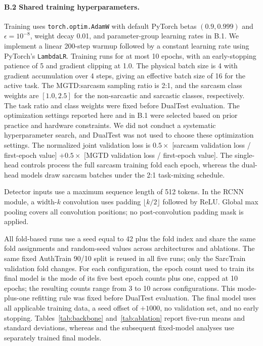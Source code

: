 \paragraph{B.2 Shared training hyperparameters.} Training uses \texttt{torch.optim.AdamW} with default PyTorch betas $(0.9,0.999)$ and $\epsilon=10^{-8}$, weight decay 0.01, and parameter-group learning rates in B.1. We implement a linear 200-step warmup followed by a constant learning rate using PyTorch's \texttt{LambdaLR}. Training runs for at most 10 epochs, with an early-stopping patience of 5 and gradient clipping at 1.0. The physical batch size is 4 with gradient accumulation over 4 steps, giving an effective batch size of 16 for the active task. The MGTD:sarcasm sampling ratio is 2:1, and the sarcasm class weights are $[1.0, 2.5]$ for the non-sarcastic and sarcastic classes, respectively. The task ratio and class weights were fixed before DualTest evaluation. The optimization settings reported here and in B.1 were selected based on prior practice and hardware constraints. We did not conduct a systematic hyperparameter search, and DualTest was not used to choose these optimization settings. The normalized joint validation loss is $0.5 \times$ [sarcasm validation loss / first-epoch value] $+ 0.5 \times$ [MGTD validation loss / first-epoch value]. The single-head controls process the full sarcasm training fold each epoch, whereas the dual-head models draw sarcasm batches under the 2:1 task-mixing schedule.

Detector inputs use a maximum sequence length of 512 tokens. In the RCNN module, a width-$k$ convolution uses padding $\lfloor k/2\rfloor$ followed by ReLU. Global max pooling covers all convolution positions; no post-convolution padding mask is applied.

All fold-based runs use a seed equal to 42 plus the fold index and share the same fold assignments and random-seed values across architectures and ablations. The same fixed AuthTrain 90/10 split is reused in all five runs; only the SarcTrain validation fold changes. For each configuration, the epoch count used to train its final model is the mode of its five best epoch counts plus one, capped at 10 epochs; the resulting counts range from 3 to 10 across configurations. This mode-plus-one refitting rule was fixed before DualTest evaluation. The final model uses all applicable training data, a seed offset of $+1000$, no validation set, and no early stopping. Tables~\ref{tab:backbone} and~\ref{tab:ablation} report five-run means and standard deviations, whereas  and the subsequent fixed-model analyses use separately trained final models.

